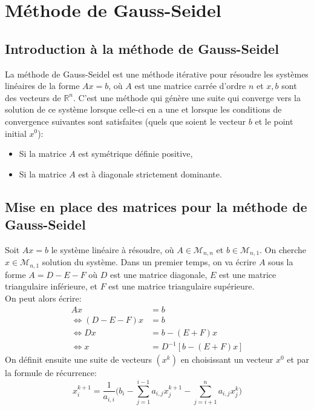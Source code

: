 \documentclass{report}
\begin{document}
\lstset{
  firstnumber=0, 
  numbers=left,               
  frame=single,
  language=C,                                       
  showstringspaces=false
}
\section{Méthode de Gauss-Seidel}
\subsection{Introduction à la méthode de Gauss-Seidel}
La méthode de Gauss-Seidel est une méthode itérative pour résoudre 
les systèmes linéaires de la forme $Ax=b$, où $A$ est une matrice carrée d'ordre $n$ et $x, b$ sont des vecteurs de $\mathbb{R}^n$. 
C'est une méthode qui génère 
une suite qui converge vers la solution de ce système lorsque celle-ci en a une et lorsque les conditions de convergence suivantes sont satisfaites (quels que soient le vecteur $b$ et le point initial $x^0$):
\begin{itemize}
  \item Si la matrice $A$ est symétrique définie positive,
  \item Si la matrice $A$ est à diagonale strictement dominante.
\end{itemize}
\subsection{Mise en place des matrices pour la méthode de Gauss-Seidel}
Soit $Ax=b$ le système linéaire à résoudre, où $A\in \mathcal{M}_{n,n}$ et $b\in  \mathcal{M}_{n,1}$. On cherche $x\in \mathcal{M}_{n,1}$ solution du système.
Dans un premier temps, on va écrire $A$ sous la forme $A=D-E-F$ où $D$ est une matrice diagonale, $E$ est une matrice triangulaire inférieure, et $F$ est une matrice triangulaire supérieure. \\
On peut alors écrire:
\begin{align}
  Ax&=b \\
  \Leftrightarrow  (D-E-F)x&=b \\
  \Leftrightarrow  Dx&=b-(E+F)x \\
  \Leftrightarrow  x&=D^{-1}[b-(E+F)x]
\end{align}
On définit ensuite une suite de vecteurs $(x^k)$ en choisissant un vecteur $x^0$ et par la formule de récurrence:\\
\begin{equation}
  x_i^{k+1}=\frac{1}{a_{i,i}}\Bigg(b_i-\sum \limits_{j = 1}^{i-1}a_{i,j}x_{j}^{k+1} - \sum \limits_{j = i+1}^{n}a_{i,j}x_{j}^{k}\Bigg)
\end{equation}
\end{document}
